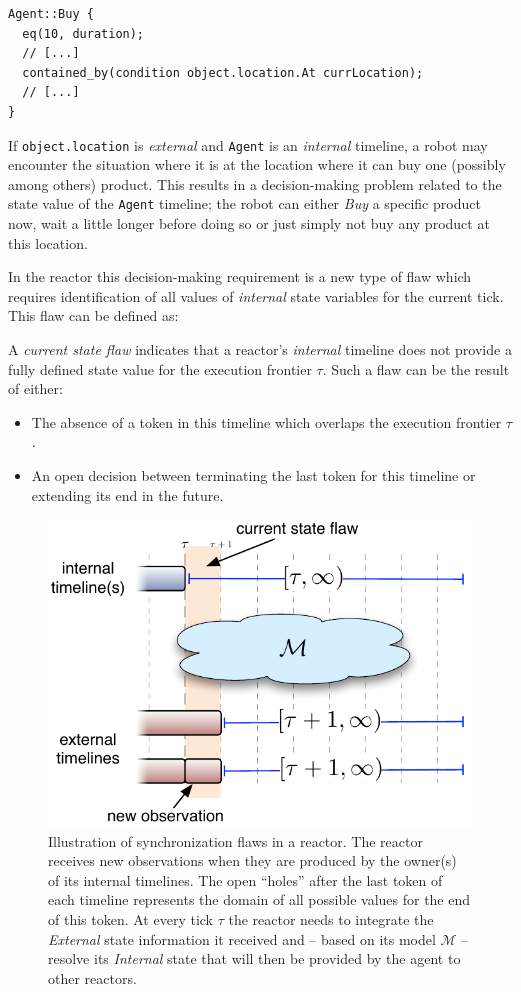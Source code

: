 \begin{verbatim}
Agent::Buy {
  eq(10, duration);
  // [...]
  contained_by(condition object.location.At currLocation);
  // [...]
}
\end{verbatim}

If \texttt{object.location} is {\em external} and
\texttt{Agent} is an {\em internal} timeline, a robot may encounter
the situation where it is at the location where it can buy one
(possibly among others) product. This results in a decision-making
problem related to the state value of the \texttt{Agent} timeline; the
robot can either {\em Buy} a specific product now, wait a little
longer before doing so or just simply not buy any product at this
location.

In the  reactor this decision-making
requirement is a new type of flaw which requires identification of all
values of {\em internal} state variables for the current tick. This
flaw can be defined as:

\begin{definition}
  \label{def:csf}
  A {\em current state flaw} indicates that a reactor's {\em internal}
  timeline does not provide a fully defined state value for the
  execution frontier $\tau$. Such a flaw can be the result of either:

  \begin{itemize}
  \item The absence of a token in this timeline which overlaps the
    execution frontier $\tau$.
  \item An open decision between terminating the last token for this
    timeline or extending its end in the future.
  \end{itemize}

\end{definition} 

\begin{figure}[!htbp]
  \centering
  \includegraphics[width=0.5\columnwidth]{figs/synch-relation}
  \caption{\small Illustration of synchronization flaws in a
    reactor. The reactor receives new observations when they are
    produced by the owner(s) of its internal timelines. The open
    ``holes'' after the last token of each timeline represents the
    domain of all possible values for the end of this token. At every
    tick $\tau$ the reactor needs to integrate the {\em External}
    state information it received and -- based on its model
    $\mathcal{M}$ -- resolve its {\em Internal} state that will then
    be provided  by the agent to other reactors.}
  \label{fig:synch:flaw}
\end{figure}


